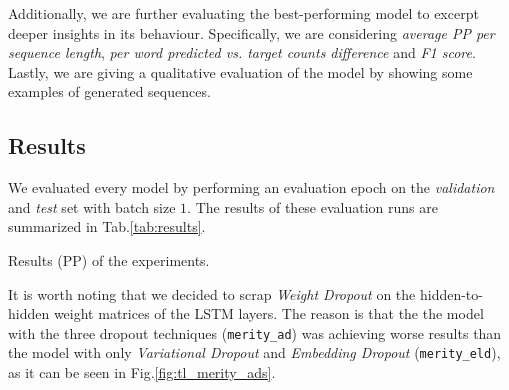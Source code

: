 Additionally, we are further evaluating the best-performing model to excerpt deeper insights in its behaviour. Specifically, we are considering \emph{average PP per sequence length}, \emph{per word predicted vs. target counts difference} and \emph{F1 score}. Lastly, we are giving a qualitative evaluation of the model by showing some examples of generated sequences.

\subsection{Results}
We evaluated every model by performing an evaluation epoch on the \emph{validation} and \emph{test} set with batch size $1$. The results of these evaluation runs are summarized in Tab.\ref{tab:results}.
\begin{table}
    
    \caption{Results (PP) of the experiments.}
    \label{tab:results}
\end{table}
It is worth noting that we decided to scrap \emph{Weight Dropout} on the hidden-to-hidden weight matrices of the LSTM layers. The reason is that the the model with the three dropout techniques (\texttt{merity\_ad}) was achieving worse results than the model with only \emph{Variational Dropout} and \emph{Embedding Dropout} (\texttt{merity\_eld}), as it can be seen in Fig.\ref{fig:tl_merity_ads}.


